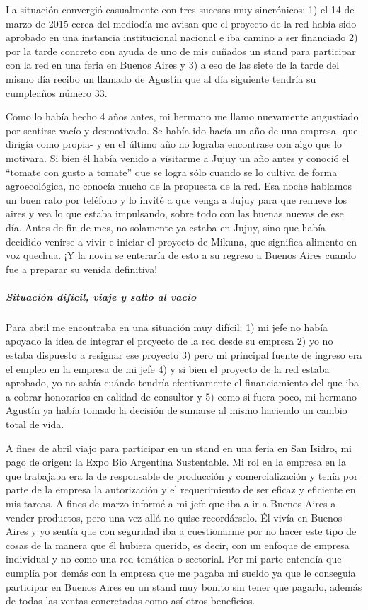 \documentclass[
]{article}
\begin{document}
La situación convergió casualmente con tres sucesos muy sincrónicos: 1)
el 14 de marzo de 2015 cerca del mediodía me avisan que el proyecto de
la red había sido aprobado en una instancia institucional nacional e iba
camino a ser financiado 2) por la tarde concreto con ayuda de uno de mis
cuñados un stand para participar con la red en una feria en Buenos Aires
y 3) a eso de las siete de la tarde del mismo día recibo un llamado de
Agustín que al día siguiente tendría su cumpleaños número 33.

Como lo había hecho 4 años antes, mi hermano me llamo nuevamente
angustiado por sentirse vacío y desmotivado. Se había ido hacía un año
de una empresa -que dirigía como propia- y en el último año no lograba
encontrase con algo que lo motivara. Si bien él había venido a visitarme
a Jujuy un año antes y conoció el ``tomate con gusto a tomate'' que se
logra sólo cuando se lo cultiva de forma agroecológica, no conocía mucho
de la propuesta de la red. Esa noche hablamos un buen rato por teléfono
y lo invité a que venga a Jujuy para que renueve los aires y vea lo que
estaba impulsando, sobre todo con las buenas nuevas de ese día. Antes de
fin de mes, no solamente ya estaba en Jujuy, sino que había decidido
venirse a vivir e iniciar el proyecto de Mikuna, que significa alimento
en voz quechua. ¡Y la novia se enteraría de esto a su regreso a Buenos
Aires cuando fue a preparar su venida definitiva!

\hypertarget{situaciuxf3n-difuxedcil-viaje-y-salto-al-vacuxedo}{%
\subparagraph{Situación difícil, viaje y salto al
vacío}\label{situaciuxf3n-difuxedcil-viaje-y-salto-al-vacuxedo}}

Para abril me encontraba en una situación muy difícil: 1) mi jefe no
había apoyado la idea de integrar el proyecto de la red desde su empresa
2) yo no estaba dispuesto a resignar ese proyecto 3) pero mi principal
fuente de ingreso era el empleo en la empresa de mi jefe 4) y si bien el
proyecto de la red estaba aprobado, yo no sabía cuándo tendría
efectivamente el financiamiento del que iba a cobrar honorarios en
calidad de consultor y 5) como si fuera poco, mi hermano Agustín ya
había tomado la decisión de sumarse al mismo haciendo un cambio total de
vida.

A fines de abril viajo para participar en un stand en una feria en San
Isidro, mi pago de origen: la Expo Bio Argentina Sustentable. Mi rol en
la empresa en la que trabajaba era la de responsable de producción y
comercialización y tenía por parte de la empresa la autorización y el
requerimiento de ser eficaz y eficiente en mis tareas. A fines de marzo
informé a mi jefe que iba a ir a Buenos Aires a vender productos, pero
una vez allá no quise recordárselo. Él vivía en Buenos Aires y yo sentía
que con seguridad iba a cuestionarme por no hacer este tipo de cosas de
la manera que él hubiera querido, es decir, con un enfoque de empresa
individual y no como una red temática o sectorial. Por mi parte entendía
que cumplía por demás con la empresa que me pagaba mi sueldo ya que le
conseguía participar en Buenos Aires en un stand muy bonito sin tener
que pagarlo, además de todas las ventas concretadas como así otros
beneficios.
\end{document}
